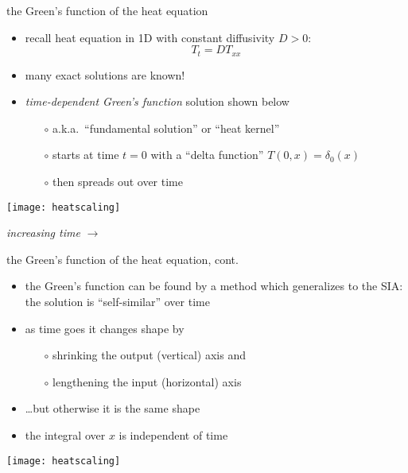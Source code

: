 \begin{frame}{the Green's function of the heat equation}

\begin{itemize}
\item recall heat equation in 1D with constant diffusivity $D>0$:
	$$T_t = D T_{xx}$$
\item many exact solutions are known!
\item \emph{time-dependent Green's function} solution shown below
  \begin{itemize}
  \item[$\circ$] a.k.a.~``fundamental solution'' or ``heat kernel''
  \item[$\circ$] starts at time $t=0$ with a ``delta function'' $T(0,x)=\delta_0(x)$
  \item[$\circ$] then spreads out over time
  \end{itemize}
\end{itemize}

\begin{center}
\texttt{[image: heatscaling]}

\emph{increasing time} \Large $\to$
\end{center}
\end{frame}


\begin{frame}{the Green's function of the heat equation, cont.}

\begin{itemize}
\item the Green's function can be found by a method which generalizes to the SIA: the solution is ``self-similar'' over time
\item as time goes it changes shape by
  \begin{itemize}
  \item[$\circ$] shrinking the output (vertical) axis and
  \item[$\circ$] lengthening the input (horizontal) axis
  \end{itemize}
\item \dots but otherwise it is the same shape
\item the integral over $x$ is independent of time
\end{itemize}

\begin{center}
\texttt{[image: heatscaling]}
\end{center}
\end{frame}


